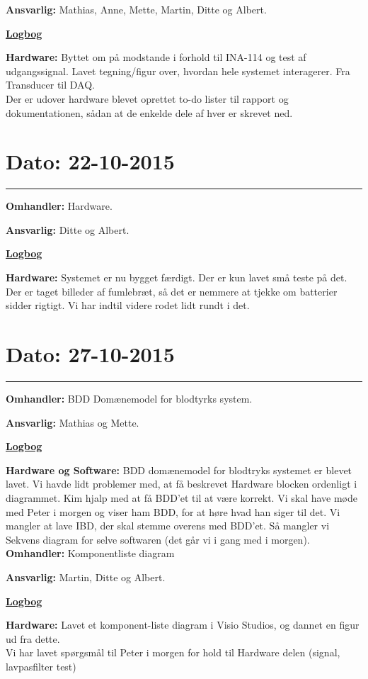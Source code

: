\textbf{Ansvarlig:} Mathias, Anne, Mette, Martin, Ditte og Albert.

\underline{\textbf{Logbog}}

\textbf{Hardware: }Byttet om på modstande i forhold til INA-114 og test af udgangssignal. Lavet tegning/figur over, hvordan hele systemet interagerer. Fra Transducer til DAQ.  
\\
Der er udover hardware blevet oprettet to-do lister til rapport og dokumentationen, sådan at de enkelde dele af hver er skrevet ned.

\section{Dato: 22-10-2015}
\hrule
\textbf{Omhandler:} Hardware.

\textbf{Ansvarlig:} Ditte og Albert.

\underline{\textbf{Logbog}}

\textbf{Hardware: }Systemet er nu bygget færdigt. Der er kun lavet små teste på det. Der er taget billeder af fumlebræt, så det er nemmere at tjekke om batterier sidder rigtigt. Vi har indtil videre rodet lidt rundt i det.  
\\

\section{Dato: 27-10-2015}
\hrule
\textbf{Omhandler:} BDD Domænemodel for blodtyrks system. 

\textbf{Ansvarlig:} Mathias og Mette.

\underline{\textbf{Logbog}}

\textbf{Hardware og Software: } BDD domænemodel for blodtryks systemet er blevet lavet. Vi havde lidt problemer med, at få beskrevet Hardware blocken ordenligt i diagrammet. Kim hjalp med at få BDD'et til at være korrekt. Vi skal have møde med Peter i morgen og viser ham BDD, for at høre hvad han siger til det. 
Vi mangler at lave IBD, der skal stemme overens med BDD'et. Så mangler vi Sekvens diagram for selve softwaren (det går vi i gang med i morgen).
\\

\textbf{Omhandler:} Komponentliste diagram

\textbf{Ansvarlig:} Martin, Ditte og Albert.

\underline{\textbf{Logbog}}

\textbf{Hardware: } Lavet et komponent-liste diagram i Visio Studios, og dannet en figur ud fra dette. 
\\
Vi har lavet spørgsmål til Peter i morgen for hold til Hardware delen (signal, lavpasfilter test)

